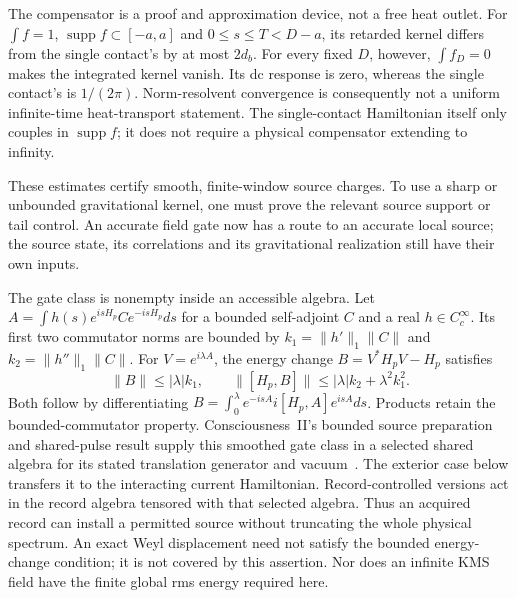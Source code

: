 The compensator is a proof and approximation device, not a free heat
outlet. For $\int f=1$, $\operatorname{supp}f\subset[-a,a]$ and
$0\le s\le T<D-a$, its retarded kernel differs from the single
contact's by at most $2d_b$. For every fixed $D$, however,
$\int f_D=0$ makes the integrated kernel vanish. Its dc response is
zero, whereas the single contact's is $1/(2\pi)$.
Norm-resolvent convergence is consequently not a uniform
infinite-time heat-transport statement. The single-contact
Hamiltonian itself only couples in $\operatorname{supp}f$; it does
not require a physical compensator extending to infinity.

These estimates certify smooth, finite-window source charges.
To use a sharp or unbounded gravitational kernel, one must prove
the relevant source support or tail control. An accurate field
gate now has a route to an accurate local source; the source
state, its correlations and its gravitational realization still
have their own inputs.

The gate class is nonempty inside an accessible algebra. Let
$A=\int h(s)e^{isH_p}Ce^{-isH_p}ds$ for a bounded self-adjoint
$C$ and a real $h\in C_c^\infty$. Its first two commutator norms are
bounded by $k_1=\|h'\|_1\|C\|$ and $k_2=\|h''\|_1\|C\|$.
For $V=e^{i\lambda A}$, the energy change $B=V^*H_pV-H_p$ satisfies
\[
 \|B\|\le|\lambda|k_1,\qquad
 \|[H_p,B]\|\le|\lambda|k_2+\lambda^2k_1^2.
\]
Both follow by differentiating
$B=\int_0^\lambda e^{-isA}i[H_p,A]e^{isA}ds$.
Products retain the bounded-commutator property. Consciousness~II's
bounded source preparation and shared-pulse result supply this
smoothed gate class in a selected shared algebra for its stated
translation generator and vacuum~\cite{Liu2026CII}. The exterior
case below transfers it to the interacting current Hamiltonian.
Record-controlled versions
act in the record algebra tensored with that selected algebra.
Thus an acquired record can install a permitted source without
truncating the whole physical spectrum. An exact Weyl displacement
need not satisfy the bounded energy-change condition; it is not
covered by this assertion. Nor does an infinite KMS field have the
finite global rms energy required here.

